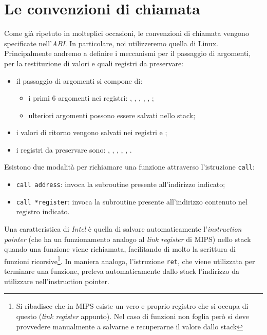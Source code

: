 \section{Le convenzioni di chiamata}
Come già ripetuto in molteplici occasioni, le convenzioni di chiamata vengono specificate nell'\emph{ABI}. In particolare, noi utilizzeremo quella di Linux. Principalmente andremo a definire i meccanismi per il passaggio di argomenti, per la restituzione di valori e quali registri da preservare:
\begin{itemize}
	\item il passaggio di argomenti si compone di:
	\begin{itemize}
		\item i primi \(6\) argomenti nei registri: , , , , , ;
		\item ulteriori argomenti possono essere salvati nello stack;
	\end{itemize}
	\item i valori di ritorno vengono salvati nei registri  e ;
	\item i registri da preservare sono: , , , , , .
\end{itemize}
Esistono due modalità per richiamare una funzione attraverso l'istruzione \texttt{call}:
\begin{itemize}
	\item \texttt{call address}: invoca la subroutine presente all'indirizzo indicato;
	\item \texttt{call *register}: invoca la subroutine presente all'indirizzo contenuto nel registro indicato.
\end{itemize}
Una caratteristica di \emph{Intel} è quella di salvare automaticamente l'\emph{instruction pointer} (che ha un funzionamento analogo al \emph{link register} di MIPS) nello stack quando una funzione viene richiamata, facilitando di molto la scrittura di funzioni ricorsive\footnote{Si ribadisce che in MIPS esiste un vero e proprio registro che si occupa di questo (\emph{link register} appunto). Nel caso di funzioni non foglia però si deve provvedere manualmente a salvarne e recuperarne il valore dallo stack}. In maniera analoga, l'istruzione \texttt{ret}, che viene utilizzata per terminare una funzione, preleva automaticamente dallo stack l'indirizzo da utilizzare nell'instruction pointer.

